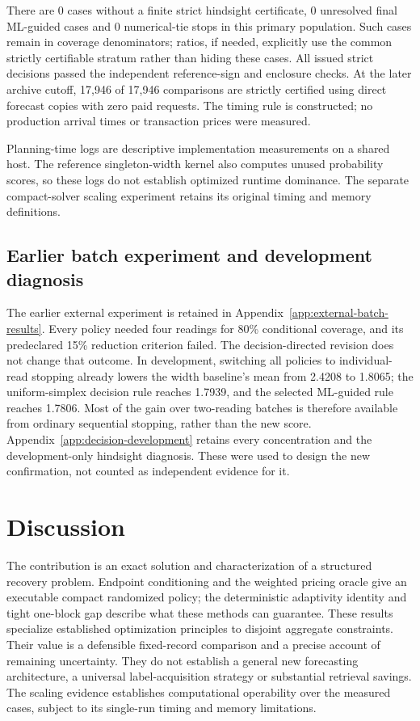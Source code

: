 \documentclass[12pt]{article}
\begin{document}
There are 0 cases without a finite strict
hindsight certificate, 0 unresolved final ML-guided cases and
0 numerical-tie stops in this primary population.
Such cases remain in coverage denominators; ratios, if needed, explicitly
use the common strictly certifiable stratum rather than hiding these cases.
All issued strict decisions passed the independent reference-sign and
enclosure checks. At the later archive cutoff,
17,946 of 17,946 comparisons are
strictly certified using direct forecast copies with zero paid requests.
The timing rule is constructed; no production arrival times or transaction
prices were measured.

Planning-time logs are descriptive implementation measurements on a shared
host. The reference singleton-width kernel also computes unused probability
scores, so these logs do not establish optimized runtime dominance. The
separate compact-solver scaling experiment retains its original timing and
memory definitions.

\subsection{Earlier batch experiment and development diagnosis}
The earlier external experiment is retained in
Appendix~\ref{app:external-batch-results}. Every policy needed four
readings for 80\% conditional coverage, and its predeclared 15\% reduction
criterion failed. The decision-directed revision does not change that
outcome. In development, switching all policies to individual-read stopping
already lowers the width baseline's mean from 2.4208 to 1.8065; the
uniform-simplex decision rule reaches 1.7939, and the selected ML-guided
rule reaches 1.7806. Most of the gain over two-reading batches is therefore
available from ordinary sequential stopping, rather than the new score.
Appendix~\ref{app:decision-development} retains every concentration and
the development-only hindsight diagnosis. These were used to design the
new confirmation, not counted as independent evidence for it.

\section{Discussion}
The contribution is an exact solution and characterization of a
structured recovery problem. Endpoint conditioning and the weighted
pricing oracle give an executable compact randomized policy; the
deterministic adaptivity identity and tight one-block gap describe what
these methods can guarantee. These results specialize established
optimization principles to disjoint aggregate constraints. Their value
is a defensible fixed-record comparison and a precise account of
remaining uncertainty. They do not establish a general new forecasting
architecture, a universal label-acquisition strategy or substantial
retrieval savings. The scaling evidence establishes computational
operability over the measured cases, subject to its single-run timing
and memory limitations.
\end{document}
